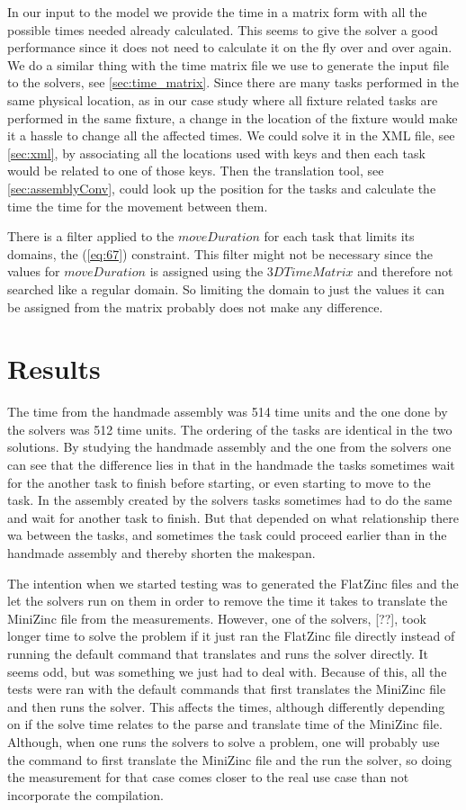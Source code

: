 In our input to the model we provide the time in a matrix form with all the possible times needed already calculated. This seems to give the solver a good performance since it does not need to calculate it on the fly over and over again. We do a similar thing with the time matrix file we use to generate the input file to the solvers, see \ref{sec:time_matrix}. Since there are many tasks performed in the same physical location, as in our case study where all fixture related tasks are performed in the same fixture, a change in the location of the fixture would make it a hassle to change all the affected times. We could solve it in the XML file, see \ref{sec:xml}, by associating all the locations used with keys and then each task would be related to one of those keys. Then the translation tool, see \ref{sec:assemblyConv}, could look up the position for the tasks and calculate the time the time for the movement between them.

There is a filter applied to the $moveDuration$ for each task that limits its domains, the (\ref{eq:67}) constraint. This filter might not be necessary since the values for $moveDuration$ is assigned using the $3DTimeMatrix$ and therefore not searched like a regular domain. So limiting the domain to just the values it can be assigned from the matrix probably does not make any difference.

\section{Results}
The time from the handmade assembly was 514 time units and the one done by the solvers was 512 time units. The ordering of the tasks are identical in the two solutions. By studying the handmade assembly and the one from the solvers one can see that the difference lies in that in the handmade the tasks sometimes wait for the another task to finish before starting, or even starting to move to the task. In the assembly created by the solvers tasks sometimes had to do the same and wait for another task to finish. But that depended on what relationship there wa between the tasks, and sometimes the task could proceed earlier than in the handmade assembly and thereby shorten the makespan.

The intention when we started testing was to generated the FlatZinc files and the let the solvers run on them in order to remove the time it takes to translate the MiniZinc file from the measurements. However, one of the solvers, [??], took longer time to solve the problem if it just ran the FlatZinc file directly instead of running the default command that translates and runs the solver directly. It seems odd, but was something we just had to deal with. Because of this, all the tests were ran with the default commands that first translates the MiniZinc file and then runs the solver. This affects the times, although differently depending on if the solve time relates to the parse and translate time of the MiniZinc file. Although, when one runs the solvers to solve a problem, one will probably use the command to first translate the MiniZinc file and the run the solver, so doing the measurement for that case comes closer to the real use case than not incorporate the compilation.

